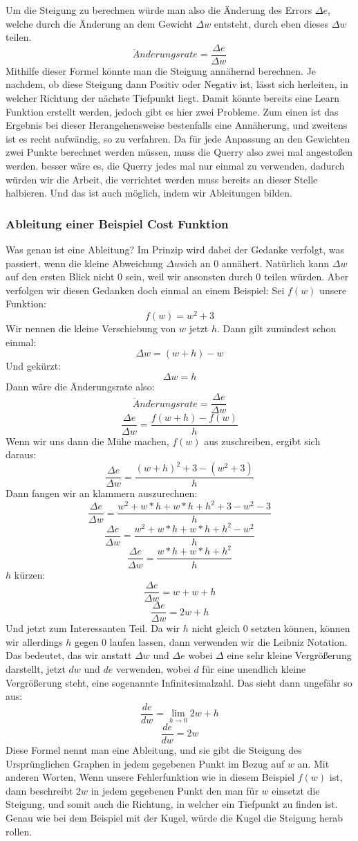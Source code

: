 \documentclass[12pt]{article}
\begin{document}
Um die Steigung zu berechnen würde man also die Änderung des Errors $\Delta e$, welche durch die Änderung an dem Gewicht $\Delta w$ entsteht, durch eben dieses $\Delta w$ teilen. $$\ddot{A}nderungsrate = \frac{\Delta e}{\Delta w}$$
Mithilfe dieser Formel könnte man die Steigung annähernd berechnen. Je nachdem, ob diese Steigung dann Positiv oder Negativ ist, lässt sich herleiten, in welcher Richtung der nächste Tiefpunkt liegt. Damit könnte bereits eine Learn Funktion erstellt werden, jedoch gibt es hier zwei Probleme.
Zum einen ist das Ergebnis bei dieser Herangehensweise bestenfalls eine Annäherung, und zweitens ist es recht aufwändig, so zu verfahren. Da für jede Anpassung an den Gewichten zwei Punkte berechnet werden müssen, muss die Querry also zwei mal angestoßen werden. besser wäre es, die Querry jedes mal nur einmal zu verwenden, dadurch würden wir die Arbeit, die verrichtet werden muss bereits an dieser Stelle halbieren. Und das ist auch möglich, indem wir Ableitungen bilden.
\subsubsection{Ableitung einer Beispiel Cost Funktion}
Was genau ist eine Ableitung? Im Prinzip wird dabei der Gedanke verfolgt, was passiert, wenn die kleine Abweichung $\Delta w$sich an 0 annähert. Natürlich kann $\Delta w$auf den ersten Blick nicht 0 sein, weil wir ansonsten durch 0 teilen würden. 
Aber verfolgen wir diesen Gedanken doch einmal an einem Beispiel:
Sei $f(w)$ unsere Funktion: $$f(w)=w^2+3$$
Wir nennen die kleine Verschiebung von $w$ jetzt $h$.
Dann gilt zumindest schon einmal: $$\Delta w=(w+h)-w$$Und gekürzt:$$\Delta w=h$$
Dann wäre die Änderungsrate also:$$\ddot{A}nderungsrate = \frac{\Delta e}{\Delta w}$$ $$\frac{\Delta e}{\Delta w}=\frac{f(w+h)-f(w)}{h}$$
Wenn wir uns dann die Mühe machen, $f(w)$ aus zuschreiben, ergibt sich daraus:
$$\frac{\Delta e}{\Delta w}=\frac{(w+h)^2+3-(w^2+3)}{h}$$
Dann fangen wir an klammern auszurechnen:
$$\frac{\Delta e}{\Delta w}=\frac{w^2+w*h+w*h+h^2+3-w^2-3}{h}$$
$$\frac{\Delta e}{\Delta w}=\frac{w^2+w*h+w*h+h^2-w^2}{h}$$
$$\frac{\Delta e}{\Delta w}=\frac{w*h+w*h+h^2}{h}$$
$h$ kürzen:
$$\frac{\Delta e}{\Delta w}=w+w+h$$
$$\frac{\Delta e}{\Delta w}=2w+h$$Und jetzt zum Interessanten Teil. Da wir $h$ nicht gleich 0 setzten können, können wir allerdings $h$ gegen 0 laufen lassen, dann verwenden wir die Leibniz Notation. Das bedeutet, das wir anstatt  $\Delta w$ und  $\Delta e$ wobei $\Delta$ eine sehr kleine Vergrößerung darstellt, jetzt $dw$ und $de$ verwenden, wobei $d$ für eine unendlich kleine Vergrößerung steht, eine sogenannte Infinitesimalzahl.
Das sieht dann ungefähr so aus:
$$\frac{de}{dw}=\lim_{h\to 0} 2w +h$$
$$\frac{de}{dw}=2w$$
Diese Formel nennt man eine Ableitung, und sie gibt die Steigung des Ursprünglichen Graphen in jedem gegebenen Punkt im Bezug auf $w$ an. Mit anderen Worten, Wenn unsere Fehlerfunktion wie in diesem Beispiel $f(w)$ ist, dann beschreibt $2w$ in jedem gegebenen Punkt den man für $w$ einsetzt die Steigung, und somit auch die Richtung, in welcher ein Tiefpunkt zu finden ist. Genau wie bei dem Beispiel mit der Kugel, würde die Kugel die Steigung herab rollen.
\end{document}
